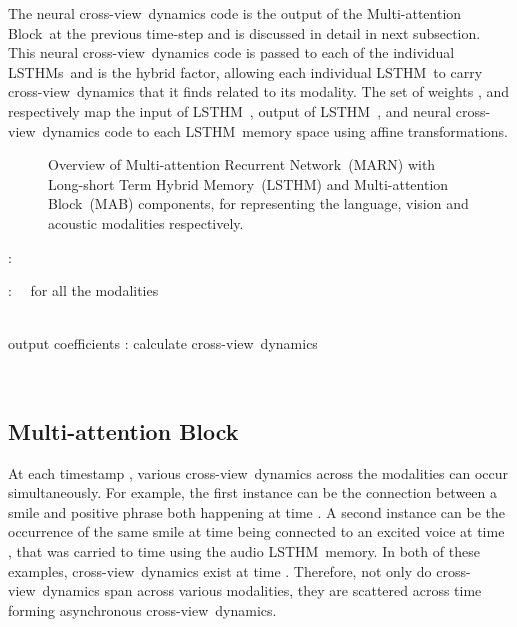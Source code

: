 \documentclass[letterpaper]{article} \usepackage{aaai18}  \usepackage{times}  \usepackage{helvet}  \usepackage{courier}  \usepackage{url}  \usepackage{graphicx}  \usepackage{multirow}
\newcommand{\pipeline}{Multi-attention Recurrent Network}
\newcommand{\pipelines}{MARN}
\newcommand{\mab}{Multi-attention Block}
\newcommand{\mabs}{MAB}
\newcommand{\inter}{cross-view}
\newcommand{\ourl}{Long-short Term Hybrid Memory}
\newcommand{\ours}{LSTHM}
\newcommand{\tname}{Long-short Term Hybrid Memory}
\newcommand{\tnames}{LSTHM}
\begin{document}
The neural \inter \ dynamics code  is the output of the \mab \ at the previous time-step and is discussed in detail in next subsection. This neural \inter \ dynamics code  is passed to each of the individual \tnames s\ and is the hybrid factor, allowing each individual \tnames \ to carry \inter \ dynamics that it finds related to its modality. The set of weights , and  respectively map the input of \tnames \ , output of \tnames \ , and neural \inter \ dynamics code  to each \tnames \ memory space using affine transformations.

\begin{figure}[t!]
    \caption{Overview of \pipeline \ (\pipelines) with \tname \ (\tnames) and \mab \ (\mabs) components, for  representing the language, vision and acoustic modalities respectively.}
    \label{fig:gmodel}
\end{figure}

\makeatletter
\def\BState{\State\hskip-\ALG@thistlm}
\makeatother

\begin{algorithm}[b!]
\caption{\pipeline \ (\pipelines), \ourl \ (\ours) and \mab \ (\mabs) Formulation}\label{alg_LSTHM}
\begin{algorithmic}[1]
\Procedure{}{}
\State 
\For {}:
\State 
\State 
\EndFor
\Return 
\EndProcedure

\Procedure{}{, }
\For {}: \ \  for all the  modalities
\State  
\State  
\State  
\State 
\State 
\State 
\EndFor
\State  \\
\noindent \quad \ \ \Return 
\EndProcedure

\Procedure{}{}
\State    output coefficients
\State  
\For {}:  calculate \inter \ dynamics
\State  
\EndFor
\State  
\State 

\noindent \quad \ \ \Return 
\EndProcedure
\end{algorithmic}
\end{algorithm}

\subsection{\mab}
\label{subsec:mab}
At each timestamp , various \inter \ dynamics across the modalities can occur simultaneously. For example, the first instance can be the connection between a smile and positive phrase both happening at time . A second instance can be the occurrence of the same smile at time  being connected to an excited voice at time , that was carried to time  using the audio \tnames \ memory. In both of these examples, \inter \ dynamics exist at time . Therefore, not only do \inter \ dynamics span across various modalities, they are scattered across time forming asynchronous \inter \ dynamics.
\end{document}

